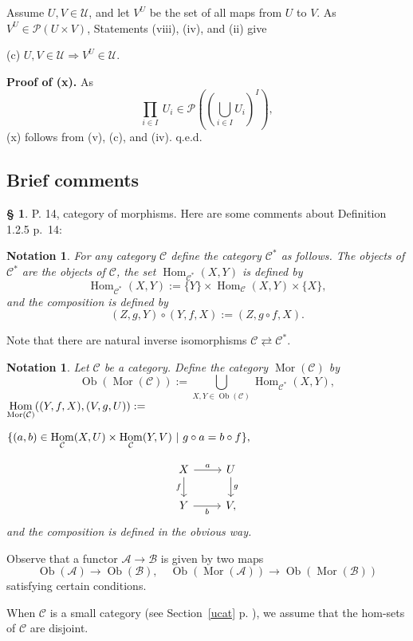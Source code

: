 \documentclass[12pt]{article}%
\newtheorem{nota}[thm]{Notation}
\theoremstyle{remark}
\theoremstyle{definition}
\newtheorem{s}[thm]{\S}%
\newcommand{\nn}{\noindent}
\newcommand{\A}{\mathcal A}
\newcommand{\B}{\mathcal B}
\newcommand{\C}{\mathcal C}
\newcommand{\then}{\Rightarrow}
\DeclareMathOperator{\Hom}{Hom}%
\DeclareMathOperator{\Mor}{Mor}
\DeclareMathOperator{\Ob}{Ob}
\begin{document}
Assume $U,V\in\mathcal U$, and let $V^U$ be the set of all maps from $U$ to $V$. As $V^U\in\mathcal P(U\times V)$, Statements (viii), (iv), and (ii) give

(c) $U,V\in\mathcal U\then V^U\in\mathcal U$.

\noindent\textbf{Proof of (x).} As 
$$
\prod_{i\in I}\ U_i\in\mathcal P\left(\left(\bigcup_{i\in I}U_i\right)^I\right),
$$
(x) follows from (v), (c), and (iv). q.e.d.


\subsection{Brief comments}

\begin{s}\label{d125}
P. 14, category of morphisms. Here are some comments about Definition 1.2.5 p.~14:

\begin{nota}\label{c*}
For any category $\C$ define the category $\C^*$\index{$\C^*$} as follows. The objects of $\C^*$ are the objects of $\C$, the set $\Hom_{\C^*}(X,Y)$ is defined by 
$$
\Hom_{\C^*}(X,Y):=\{Y\}\times\Hom_{\C}(X,Y)\times\{X\},
$$
and the composition is defined by 
$$
(Z,g,Y)\circ(Y,f,X):=(Z,g\circ f,X).
$$ 
\end{nota}

Note that there are natural inverse isomorphisms $\C\rightleftarrows\C^*$. 

\begin{nota}\label{mor}
%
Let $\C$ be a category. Define the category $\Mor(\C)$ \index{$\Mor$} by 
$$
\Ob(\Mor(\C)):=\bigcup_{X,Y\in\Ob(\C)}\Hom_{\C^*}(X,Y),
$$
$\ds\Hom_{\Mor(\C)}((Y,f,X),(V,g,U)):=$\bigskip 

$\hfill\ds\{(a,b)\in\Hom_\C(X,U)\times\Hom_\C(Y,V)\ | \ g\circ a=b\circ f\},$\bigskip

\nn{\em i.e.} 
$$
\begin{tikzcd}
X\ar{d}[swap]{f}\ar{r}{a}&U\ar{d}{g}\\ 
Y\ar{r}[swap]{b}&V,
\end{tikzcd}
$$ 
and the composition is defined in the obvious way.
\end{nota}

Observe that a functor $\A\to\B$ is given by two maps 
$$
\Ob(\A)\to\Ob(\B),\quad\Ob(\Mor(\A))\to\Ob(\Mor(\B))
$$ 
satisfying certain conditions.

When $\C$ is a small category (see Section~\ref{ucat} p. \pageref{ucat}), we assume that the hom-sets of $\C$ are disjoint.
\end{s}
\end{document}
